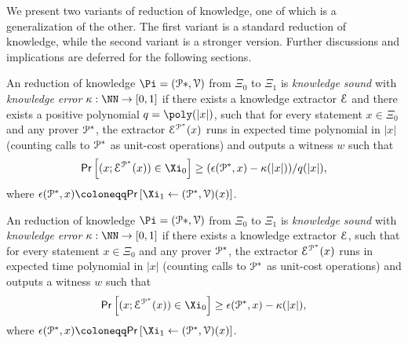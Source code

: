

We present two variants of reduction of knowledge, one of which is a generalization of the other. The first variant is a standard reduction of knowledge, while the second variant is a stronger version. Further discussions and implications are deferred for the following sections.

\begin{definition}
    An reduction of knowledge $\Pi = (\prover*, \verifier)$ from $\Xi_0$ to $\Xi_1$ is \emph{knowledge sound} with \emph{knowledge error} $\kappa : \NN \to [0, 1]$ if there exists a knowledge extractor $\mathcal{E}$ and there exists
    a positive polynomial $q = \poly(|x|)$, such that for every statement $x \in \Xi_0$ and any prover $\mathcal{P}^*$, the extractor $\mathcal{E}^{\mathcal{P}^*}(x)$ runs in expected time polynomial in $|x|$ (counting calls to $\mathcal{P}^*$ as unit-cost operations) and outputs a witness $w$ such that
    \[
    \Pr{ (x; \extractor^{\prover^*}(x)) \in \Xi_0 } \geq (\epsilon(\prover^*, x) - \kappa(|x|))  / q(|x|),
    \]
    where $\epsilon(\prover^*, x) \defeq\Pr{ \Xi_1 \leftarrow  (\prover^*, \verifier)(x) }$.
\end{definition}

\begin{definition}
    An reduction of knowledge $\Pi = (\prover*, \verifier)$ from $\Xi_0$ to $\Xi_1$ is \emph{knowledge sound} with \emph{knowledge error} $\kappa : \NN \to [0, 1]$ if there exists a knowledge extractor $\mathcal{E}$, such that for every statement $x \in \Xi_0$ and any prover $\mathcal{P}^*$, the extractor $\mathcal{E}^{\mathcal{P}^*}(x)$ runs in expected time polynomial in $|x|$ (counting calls to $\mathcal{P}^*$ as unit-cost operations) and outputs a witness $w$ such that
    \[
    \Pr{ (x; \extractor^{\prover^*}(x)) \in \Xi_0 } \geq \epsilon(\prover^*, x) - \kappa(|x|),
    \]
    where $\epsilon(\prover^*, x) \defeq\Pr{ \Xi_1 \leftarrow  (\prover^*, \verifier)(x) }$.
\end{definition}


